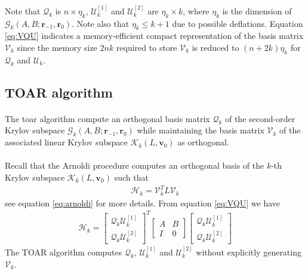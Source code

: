 Note that $\mathcal{Q}_k$ is $n\times \eta_k$, $\mathcal{U}_k^{[1]}$ and $\mathcal{U}_k^{[2]}$ are $\eta_k \times k$, where $\eta_k$ is the dimension of $\mathcal{G}_k(A,B;\mathbf{r}_{-1},\mathbf{r}_{0})$. Note also that $\eta_k \le k+1$ due to possible deflations. Equation \eqref{eq:VQU} indicates a memory-efficient compact representation of the basis matrix $\mathcal{V}_k$ since the memory size $2nk$ required to store $\mathcal{V}_k$ is reduced to $(n+2k)\eta_k$ for $\mathcal{Q}_k$ and $\mathcal{U}_k$. 

\subsection{TOAR algorithm}
\paragraph*{}
The \acrshort{toar} algorithm  compute an orthogonal basis matrix $\mathcal{Q}_k$ of the second-order Krylov subspace $\mathcal{G}_k(A,B;\mathbf{r}_{-1},\mathbf{r}_{0})$ while maintaining the basis matrix $\mathcal{V}_k$ of the associated linear Krylov subspace $\mathcal{K}_k(L, \mathbf{v}_0) $ as orthogonal.

\paragraph*{}
Recall that the Arnoldi procedure computes an orthogonal basis of the $k$-th Krylov subspace $\mathcal{K}_k(L, \mathbf{v}_0) $ such that 
\begin{align}
    \mathcal{H}_k = \mathcal{V}_k^T L \mathcal{V}_k
\end{align}
see equation \eqref{eq:arnoldi} for more details. From equation \eqref{eq:VQU} we have
\begin{align}
    \mathcal{H}_k =
        \begin{bmatrix} 
            \mathcal{Q}_k\mathcal{U}_k^{[1]} \\
            \mathcal{Q}_k\mathcal{U}_k^{[2]}
        \end{bmatrix}^T
        \begin{bmatrix}
            A & B \\
            I & 0
        \end{bmatrix}
        \begin{bmatrix} 
            \mathcal{Q}_k\mathcal{U}_k^{[1]} \\
            \mathcal{Q}_k\mathcal{U}_k^{[2]}
        \end{bmatrix}
\end{align}
The TOAR algorithm computes $\mathcal{Q}_k$, $\mathcal{U}_k^{[1]}$ and $\mathcal{U}_k^{[2]}$ without explicitly generating $\mathcal{V}_k$.

